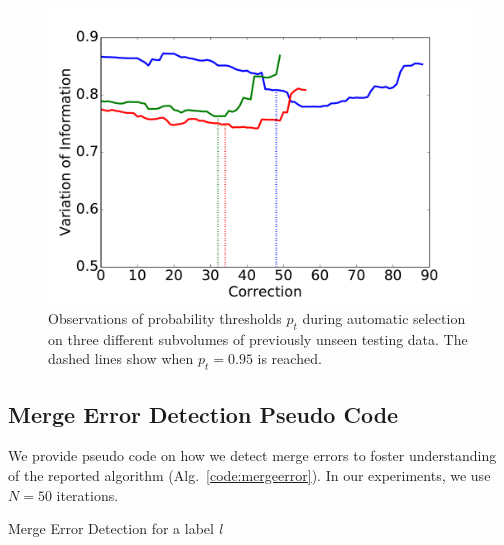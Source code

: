 \begin{figure}[t]
\centering
\includegraphics[width=\linewidth]{gfx/ptplot.pdf}
\caption{Observations of probability thresholds $p_t$ during automatic selection on three different subvolumes of previously unseen testing data. The dashed lines show when $p_t=0.95$ is reached.}
\label{fig:thresh}
\end{figure}

\subsection{Merge Error Detection Pseudo Code}

We provide pseudo code on how we detect merge errors to foster understanding of the reported algorithm (Alg.~\ref{code:mergeerror}). In our experiments, we use $N=50$ iterations.

\begin{algorithm}[H]
\caption{Merge Error Detection for a label \emph{l}}\label{code:mergeerror}
\begin{algorithmic}[1]
	\EndFor

\end{algorithmic}
\end{algorithm}

